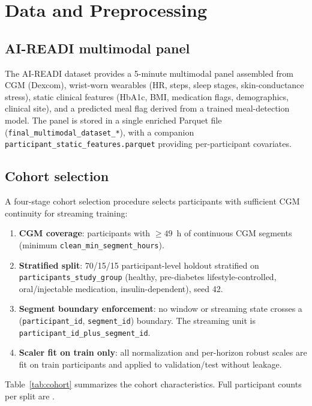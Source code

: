 \section{Data and Preprocessing}
\label{sec:data}

\subsection{AI-READI multimodal panel}

The AI-READI dataset provides a 5-minute multimodal panel assembled from CGM (Dexcom),
wrist-worn wearables (HR, steps, sleep stages, skin-conductance stress), static clinical
features (HbA1c, BMI, medication flags, demographics, clinical site), and a predicted meal
flag derived from a trained meal-detection model.
The panel is stored in a single enriched Parquet file
(\texttt{final\_multimodal\_dataset\_*}), with a companion
\texttt{participant\_static\_features.parquet} providing per-participant covariates.

\subsection{Cohort selection}

A four-stage cohort selection procedure selects participants with sufficient CGM continuity
for streaming training:
\begin{enumerate}
  \item \textbf{CGM coverage}: participants with $\ge 49$~h of continuous CGM segments
        (minimum \texttt{clean\_min\_segment\_hours}).
  \item \textbf{Stratified split}: 70/15/15 participant-level holdout stratified on
        \texttt{participants\_study\_group} (healthy, pre-diabetes lifestyle-controlled,
        oral/injectable medication, insulin-dependent), seed 42.
  \item \textbf{Segment boundary enforcement}: no window or streaming state crosses a
        (\texttt{participant\_id}, \texttt{segment\_id}) boundary.
        The streaming unit is \texttt{participant\_id\_plus\_segment\_id}.
  \item \textbf{Scaler fit on train only}: all normalization and per-horizon robust scales are
        fit on train participants and applied to validation/test without leakage.
\end{enumerate}

Table~\ref{tab:cohort} summarizes the cohort characteristics.
Full participant counts per split are .

